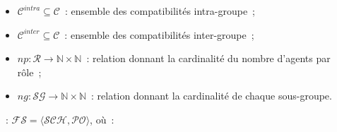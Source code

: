 \begin{itemize}
\begin{itemize}
          \item $\mathcal{C}^{intra} \subseteq \mathcal{C}$~: ensemble des compatibilités intra-groupe~;
          \item $\mathcal{C}^{inter} \subseteq \mathcal{C}$~: ensemble des compatibilités inter-groupe~;
          \item $np: \mathcal{R} \rightarrow \mathbb{N} \times \mathbb{N}$~: relation donnant la cardinalité du nombre d'agents par rôle~;
          \item $ng: \mathcal{SG} \rightarrow \mathbb{N} \times \mathbb{N}$~: relation donnant la cardinalité de chaque sous-groupe.
        \end{itemize}
\end{itemize}

\medskip

\noindent \textbf{}~: \quad $\mathcal{FS} = \langle \mathcal{SCH}, \mathcal{PO} \rangle$, où~:

